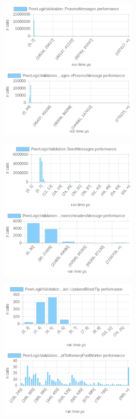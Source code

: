 \documentclass{article}
\begin{document}
\includegraphics[width=7cm]{images/mumbai/chartPeerLogicValidation_3A_3AProcessMessages.png}
\includegraphics[width=7cm]{images/mumbai/chartPeerLogicValidation_3A_3AProcessMessages-_3EProcessMessage.png}

\includegraphics[width=7cm]{images/mumbai/chartPeerLogicValidation_3A_3ASendMessages.png}
\includegraphics[width=7cm]{images/mumbai/chartPeerLogicValidation_3A_3AProcessMessages-_3EProcessMessage-_3EProcessHeadersMessage.png}

\includegraphics[width=7cm]{images/mumbai/chartPeerLogicValidation_3A_3AProcessMessages-_3EProcessMessage-_3EProcessMessage-_3EPeerLogicValidation_3A_3AUpdatedBlockTip.png}
\includegraphics[width=7cm]{images/mumbai/chartPeerLogicValidation_3A_3AProcessMessages-_3EProcessMessage-_3EAcceptToMemoryPoolWithTime-_3EAcceptToMemoryPoolWorker.png}
\end{document}
